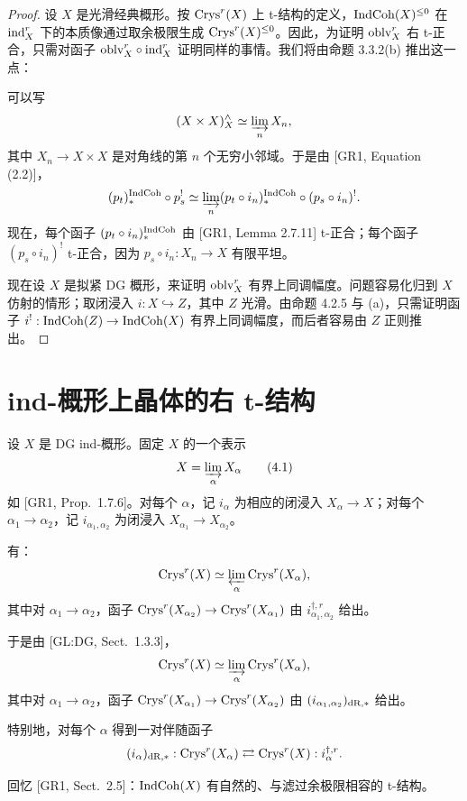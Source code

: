\begin{proof}
设 $X$ 是光滑经典概形。按 $\mathrm{Crys}^r(X)$ 上 t-结构的定义，$\mathrm{IndCoh}(X)^{\leq 0}$ 在 $\mathrm{ind}^r_X$ 下的本质像通过取余极限生成 $\mathrm{Crys}^r(X)^{\leq 0}$。因此，为证明 $\mathrm{oblv}^r_X$ 右 t-正合，只需对函子 $\mathrm{oblv}^r_X\circ\mathrm{ind}^r_X$ 证明同样的事情。我们将由命题 3.3.2(b) 推出这一点：

可以写
\[
(X\times X)^{\wedge}_X\simeq\varinjlim_n X_n,
\]
其中 $X_n\to X\times X$ 是对角线的第 $n$ 个无穷小邻域。于是由 [GR1, Equation (2.2)]，
\[
(p_t)_*^{\mathrm{IndCoh}}\circ p_s^!\simeq\varinjlim_n (p_t\circ i_n)_*^{\mathrm{IndCoh}}\circ(p_s\circ i_n)^!.
\]
现在，每个函子 $(p_t\circ i_n)_*^{\mathrm{IndCoh}}$ 由 [GR1, Lemma 2.7.11] t-正合；每个函子 $(p_s\circ i_n)^!$ t-正合，因为 $p_s\circ i_n:X_n\to X$ 有限平坦。

现在设 $X$ 是拟紧 DG 概形，来证明 $\mathrm{oblv}^r_X$ 有界上同调幅度。问题容易化归到 $X$ 仿射的情形；取闭浸入 $i:X\hookrightarrow Z$，其中 $Z$ 光滑。由命题 4.2.5 与 (a)，只需证明函子 $i^!:\mathrm{IndCoh}(Z)\to\mathrm{IndCoh}(X)$ 有界上同调幅度，而后者容易由 $Z$ 正则推出。
\end{proof}

\section{ind-概形上晶体的右 t-结构}

设 $X$ 是 DG ind-概形。固定 $X$ 的一个表示
\begin{equation}
X=\varinjlim_\alpha X_\alpha\tag{4.1}
\end{equation}
如 [GR1, Prop.~1.7.6]。对每个 $\alpha$，记 $i_\alpha$ 为相应的闭浸入 $X_\alpha\to X$；对每个 $\alpha_1\to\alpha_2$，记 $i_{\alpha_1,\alpha_2}$ 为闭浸入 $X_{\alpha_1}\to X_{\alpha_2}$。

有：
\[
\mathrm{Crys}^r(X)\simeq\varprojlim_\alpha\mathrm{Crys}^r(X_\alpha),
\]
其中对 $\alpha_1\to\alpha_2$，函子 $\mathrm{Crys}^r(X_{\alpha_2})\to\mathrm{Crys}^r(X_{\alpha_1})$ 由 $i^{\dagger,r}_{\alpha_1,\alpha_2}$ 给出。

于是由 [GL:DG, Sect.~1.3.3]，
\[
\mathrm{Crys}^r(X)\simeq\varinjlim_\alpha\mathrm{Crys}^r(X_\alpha),
\]
其中对 $\alpha_1\to\alpha_2$，函子 $\mathrm{Crys}^r(X_{\alpha_1})\to\mathrm{Crys}^r(X_{\alpha_2})$ 由 $(i_{\alpha_1,\alpha_2})_{\mathrm{dR},*}$ 给出。

特别地，对每个 $\alpha$ 得到一对伴随函子
\[
(i_\alpha)_{\mathrm{dR},*}:\mathrm{Crys}^r(X_\alpha)\rightleftarrows\mathrm{Crys}^r(X):i^{\dagger,r}_\alpha.
\]

回忆 [GR1, Sect.~2.5]：$\mathrm{IndCoh}(X)$ 有自然的、与滤过余极限相容的 t-结构。

